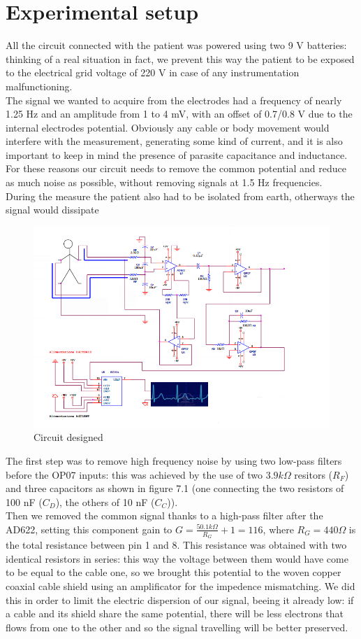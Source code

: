 \section{Experimental setup}
All the circuit connected with the patient was powered using two 9 V batteries: thinking of a real situation in fact, we prevent this way the patient to be exposed to the electrical grid voltage of 220 V in case of any instrumentation malfunctioning.\\
The signal we wanted to acquire from the electrodes had a frequency of nearly 1.25 Hz and an amplitude from 1 to 4 mV, with an offset of 0.7/0.8 V due to the internal electrodes potential. Obviously any cable or body movement would interfere with the measurement, generating some kind of current, and it is also important to keep in mind the presence of parasite capacitance and inductance. For these reasons our circuit needs to remove the common potential and reduce as much noise as possible, without removing signals at 1.5 Hz frequencies.\\
During the measure the patient also had to be isolated from earth, otherways the signal would dissipate
\begin{figure}[H]
\centering
\includegraphics[width=.8\textwidth]{8/circuit.png}
\caption{Circuit designed}
\end{figure}
The  first step was to remove high frequency noise by using two low-pass filters before the OP07 inputs: this was achieved by the use of two $3.9 k\Omega$ resitors ($R_F$) and three capacitors as shown in figure 7.1 (one connecting the two resistors of 100 nF ($C_D$), the others of 10 nF ($C_C$)).\\
Then we removed the common signal thanks to a high-pass filter after the AD622, setting this component gain to $G =   \frac{50.1 k\Omega}{R_G} + 1 = 116$, where $R_G = 440 \Omega$ is the total resistance between pin 1 and 8. This resistance was obtained with two identical resistors in series: this way the voltage between them would have come to be equal to the cable one, so we brought this potential to the woven copper coaxial cable shield using an amplificator for the impedence mismatching. We did this in order to limit the electric dispersion of our signal, beeing it already low: if a cable and its shield share the same potential, there will be less electrons that flows from one to the other and so the signal travelling will be better preserved.\\
